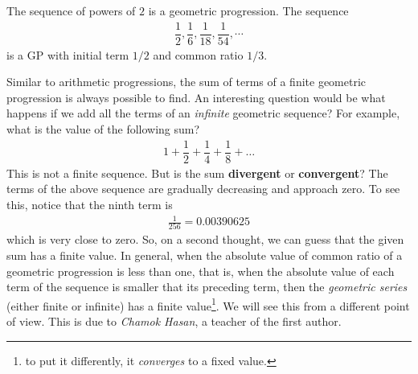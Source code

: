 \documentclass{subfile}
\begin{document}
	\begin{example}
		The sequence of powers of $2$ is a geometric progression. The sequence
			\begin{align*}
				\dfrac{1}{2}, \dfrac{1}{6}, \dfrac{1}{18}, \dfrac{1}{54}, \cdots
			\end{align*}
		is a GP with initial term $1/2$ and common ratio $1/3$.
	\end{example}

	Similar to arithmetic progressions, the sum of terms of a finite geometric progression is always possible to find. An interesting question would be what happens if we add all the terms of an \textit{infinite} geometric sequence? For example, what is the value of the following sum?
		\begin{align*}
			1 + \dfrac{1}{2}+ \dfrac{1}{4}+\dfrac{1}{8}+ \ldots
		\end{align*}
	This is not a finite sequence. But is the sum \textbf{divergent} or \textbf{convergent}? The terms of the above sequence are gradually decreasing and approach zero. To see this, notice that the ninth term is
		\begin{align*}
			\frac{1}{256} = 0.00390625
		\end{align*}
	which is very close to zero. So, on a second thought, we can guess that the given sum has a finite value. In general, when the absolute value of common ratio of a geometric progression is less than one, that is, when the absolute value of each term of the sequence is smaller that its preceding term, then the \textit{geometric series} (either finite or infinite) has a finite value\footnote{to put it differently, it \textit{converges} to a fixed value.}. We will see this from a different point of view. This is due to \textit{Chamok Hasan}, a teacher of the first author.
\end{document}
